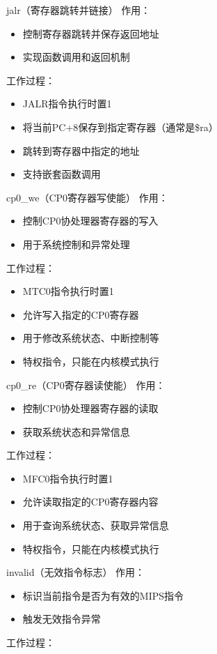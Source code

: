 jalr（寄存器跳转并链接） 作用：

\begin{itemize}
\item 控制寄存器跳转并保存返回地址
\item 实现函数调用和返回机制
\end{itemize}
工作过程：

\begin{itemize}
\item JALR指令执行时置1
\item 将当前PC+8保存到指定寄存器（通常是\$ra）
\item 跳转到寄存器中指定的地址
\item 支持嵌套函数调用
\end{itemize}

cp0\_we（CP0寄存器写使能） 作用：

\begin{itemize}
\item 控制CP0协处理器寄存器的写入
\item 用于系统控制和异常处理
\end{itemize}
工作过程：

\begin{itemize}
\item MTC0指令执行时置1
\item 允许写入指定的CP0寄存器
\item 用于修改系统状态、中断控制等
\item 特权指令，只能在内核模式执行
\end{itemize}

cp0\_re（CP0寄存器读使能） 作用：

\begin{itemize}
\item 控制CP0协处理器寄存器的读取
\item 获取系统状态和异常信息
\end{itemize}
工作过程：

\begin{itemize}
\item MFC0指令执行时置1
\item 允许读取指定的CP0寄存器内容
\item 用于查询系统状态、获取异常信息
\item 特权指令，只能在内核模式执行
\end{itemize}

invalid（无效指令标志） 作用：

\begin{itemize}
\item 标识当前指令是否为有效的MIPS指令
\item 触发无效指令异常
\end{itemize}
工作过程：

